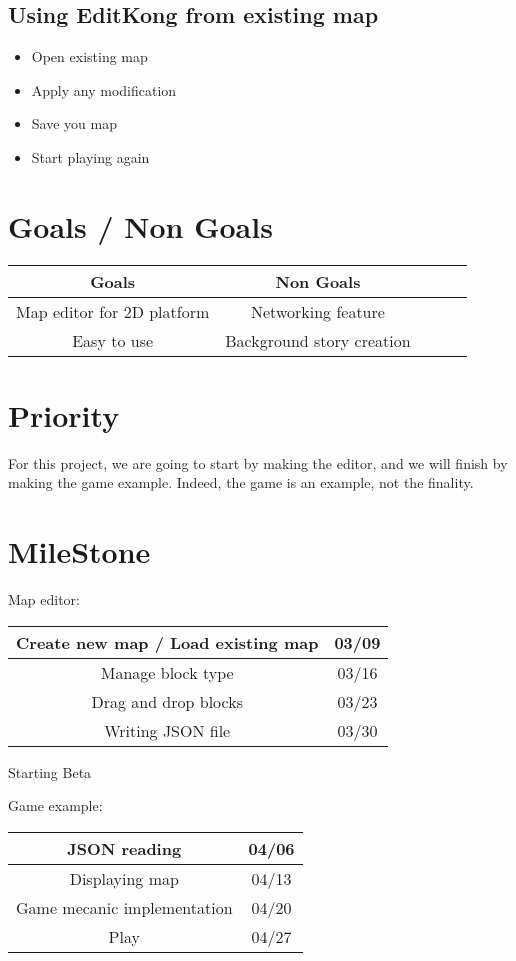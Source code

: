 \subsection{Using EditKong from existing map}

\begin{itemize}
\item Open existing map
\item Apply any modification
\item Save you map
\item Start playing again
\end{itemize}

\section{Goals / Non Goals}

\begin{center}
	\begin{tabular}{| c | c | c | c | p{6cm} |}
			\hline \rowcolor{LightGrey} Goals & Non Goals \\
			\hline Map editor for 2D platform & Networking feature \\
			\hline Easy to use & Background story creation \\
			\hline
	\end{tabular}
\end{center}

\section{Priority}
For this project, we are going to start by making the editor, and we will finish by making the game example. Indeed, the game is an example, not the finality.
\section{MileStone}
Map editor:
\begin{center}
\begin{tabular}{|*{2}{c|}}
    \hline
     Create new map / Load existing map & 03/09 \\
    \hline
     Manage block type & 03/16 \\
    \hline
	Drag and drop blocks & 03/23 \\ 
    \hline
     Writing JSON file & 03/30 \\
    \hline
\end{tabular}
\end{center}
Starting Beta

Game example:
\begin{center}
\begin{tabular}{|*{2}{c|}}
    \hline
    JSON reading & 04/06\\
    \hline
     Displaying map & 04/13 \\
    \hline
	Game mecanic implementation & 04/20 \\ 
    \hline
     Play & 04/27\\
    \hline
\end{tabular}
\end{center}
